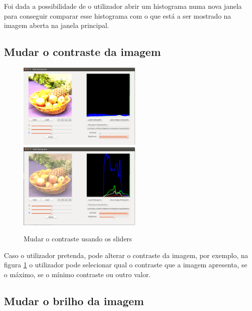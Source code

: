 \documentclass[pdftex,12pt,a4paper]{report}
\begin{document}
Foi dada a possibilidade de o utilizador abrir um histograma numa nova janela para conseguir comparar esse histograma com o que está a ser mostrado na imagem aberta na janela principal.

\subsection{Mudar o contraste da imagem}

\begin{figure}[!htb]
\center
 \includegraphics[width=60mm,scale=1]{imagens/maximum_contrast.png}
 \includegraphics[width=60mm,scale=1]{imagens/high_contrast.png}
 \caption{Mudar o contraste usando os sliders}
 \label{fig:contrastes}
\end{figure}

Caso o utilizador pretenda, pode alterar o contraste da imagem, por exemplo, na figura \ref{fig:contrastes} o utilizador pode selecionar qual o contraste que a imagem apresenta, se o máximo, se o mínimo contraste ou outro valor.

\newpage

\subsection{Mudar o brilho da imagem}
\end{document}
